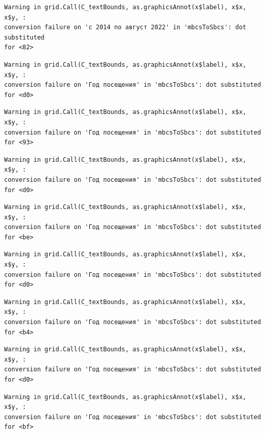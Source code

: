 \documentclass[
  letterpaper,
  DIV=11,
  numbers=noendperiod]{scrartcl}
\begin{document}
\begin{verbatim}
Warning in grid.Call(C_textBounds, as.graphicsAnnot(x$label), x$x, x$y, :
conversion failure on 'с 2014 по август 2022' in 'mbcsToSbcs': dot substituted
for <82>
\end{verbatim}

\begin{verbatim}
Warning in grid.Call(C_textBounds, as.graphicsAnnot(x$label), x$x, x$y, :
conversion failure on 'Год посещения' in 'mbcsToSbcs': dot substituted for <d0>
\end{verbatim}

\begin{verbatim}
Warning in grid.Call(C_textBounds, as.graphicsAnnot(x$label), x$x, x$y, :
conversion failure on 'Год посещения' in 'mbcsToSbcs': dot substituted for <93>
\end{verbatim}

\begin{verbatim}
Warning in grid.Call(C_textBounds, as.graphicsAnnot(x$label), x$x, x$y, :
conversion failure on 'Год посещения' in 'mbcsToSbcs': dot substituted for <d0>
\end{verbatim}

\begin{verbatim}
Warning in grid.Call(C_textBounds, as.graphicsAnnot(x$label), x$x, x$y, :
conversion failure on 'Год посещения' in 'mbcsToSbcs': dot substituted for <be>
\end{verbatim}

\begin{verbatim}
Warning in grid.Call(C_textBounds, as.graphicsAnnot(x$label), x$x, x$y, :
conversion failure on 'Год посещения' in 'mbcsToSbcs': dot substituted for <d0>
\end{verbatim}

\begin{verbatim}
Warning in grid.Call(C_textBounds, as.graphicsAnnot(x$label), x$x, x$y, :
conversion failure on 'Год посещения' in 'mbcsToSbcs': dot substituted for <b4>
\end{verbatim}

\begin{verbatim}
Warning in grid.Call(C_textBounds, as.graphicsAnnot(x$label), x$x, x$y, :
conversion failure on 'Год посещения' in 'mbcsToSbcs': dot substituted for <d0>
\end{verbatim}

\begin{verbatim}
Warning in grid.Call(C_textBounds, as.graphicsAnnot(x$label), x$x, x$y, :
conversion failure on 'Год посещения' in 'mbcsToSbcs': dot substituted for <bf>
\end{verbatim}
\end{document}
